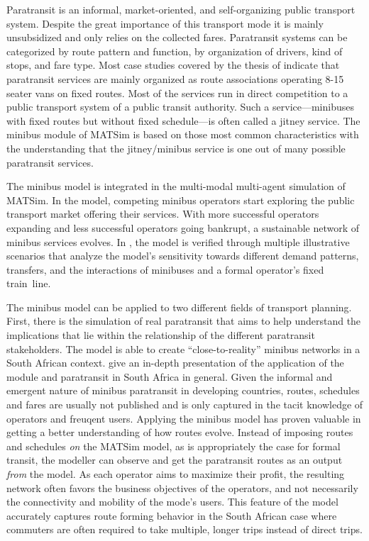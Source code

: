 Paratransit is an informal, market-oriented, and self-organizing public transport system. Despite the great importance of this transport mode it is mainly unsubsidized and only relies on the collected fares. 
Paratransit systems can be categorized by route pattern and function, by
organization of drivers, kind of stops, and fare type. Most case studies covered by the thesis of \citet[][]{Neumann_PhDThesis_2014} indicate that
paratransit services are mainly organized as route associations operating 8-15
seater vans on fixed routes. Most of the services run in direct competition to a
public transport system of a public transit authority. Such a service---minibuses with fixed routes but without fixed schedule---is often called a jitney service.
The minibus module of MATSim is based on those most common characteristics with the understanding that the jitney/minibus
service is one out of many possible paratransit services.

The minibus model is integrated in the multi-modal multi-agent simulation of MATSim. In the model, competing minibus operators start exploring the public transport market offering their services. With more successful operators expanding and less successful operators going bankrupt, a sustainable network of minibus services evolves. In \citet[][]{Neumann_PhDThesis_2014}, the model is verified through multiple illustrative scenarios that analyze the model's sensitivity towards different demand patterns, transfers, and the interactions of minibuses and a formal operator's fixed train~line.

The minibus model can be applied to two different fields of transport planning. First, there is the simulation of real paratransit that aims to help understand the implications that lie within the relationship of the different paratransit stakeholders. The model is able to create ``close-to-reality'' minibus networks in a South African context. \citet[][]{NeumannEtAl2014MinibusRSA} give an in-depth presentation of the application of the module and paratransit in South Africa in general. Given the informal and emergent nature of minibus paratransit in developing countries, routes, schedules and fares are usually not published and is only captured in the tacit knowledge of operators and freuqent users. Applying the minibus model has proven valuable in getting a better understanding of how routes evolve. Instead of imposing routes and schedules \emph{on} the MATSim model, as is appropriately the case for formal transit, the modeller can observe and get the paratransit routes as an output \emph{from} the model. As each operator aims to maximize their profit, the resulting network often favors the business objectives of the operators, and not necessarily the connectivity and mobility of the mode's users. This feature of the model accurately captures route forming behavior in the South African case where commuters are often required to take multiple, longer trips instead of direct trips.

